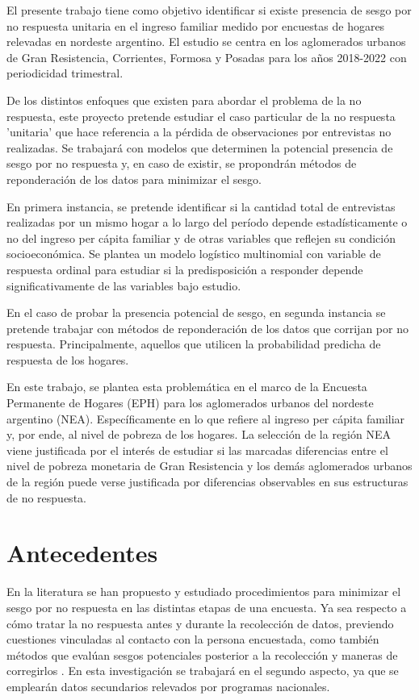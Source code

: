 \documentclass{article}
\begin{document}
El presente trabajo tiene como objetivo identificar si existe presencia de sesgo por no respuesta unitaria en el ingreso familiar medido por encuestas de hogares relevadas en nordeste argentino. El estudio se centra en los aglomerados urbanos de Gran Resistencia, Corrientes, Formosa y Posadas para los años 2018-2022 con periodicidad trimestral.

De los distintos enfoques que existen para abordar el problema de la no respuesta, este proyecto pretende estudiar el caso particular de la no respuesta 'unitaria' que hace referencia a la pérdida de observaciones por entrevistas no realizadas. Se trabajará con modelos que determinen la potencial presencia de sesgo por no respuesta y, en caso de existir, se propondrán métodos de reponderación de los datos para minimizar el sesgo.

En primera instancia, se pretende identificar si la cantidad total de entrevistas realizadas por un mismo hogar a lo largo del período depende estadísticamente o no del ingreso per cápita familiar y de otras variables que reflejen su condición socioeconómica. Se plantea un modelo logístico multinomial con variable de respuesta ordinal para estudiar si la predisposición a responder depende significativamente de las variables bajo estudio. \cite{handbook} \cite{korinek07}

En el caso de probar la presencia potencial de sesgo, en segunda instancia se pretende trabajar con métodos de reponderación de los datos que corrijan por no respuesta. Principalmente, aquellos que utilicen la probabilidad predicha de respuesta de los hogares.

En este trabajo, se plantea esta problemática en el marco de la Encuesta Permanente de Hogares (EPH) para los aglomerados urbanos del nordeste argentino (NEA). Específicamente en lo que refiere al ingreso per cápita familiar y, por ende, al nivel de pobreza de los hogares. La selección de la región NEA viene justificada por el interés de estudiar si las marcadas diferencias entre el nivel de pobreza monetaria de Gran Resistencia y los demás aglomerados urbanos de la región puede verse justificada por diferencias observables en sus estructuras de no respuesta. 


\section{Antecedentes}

En la literatura se han propuesto y estudiado procedimientos para minimizar el sesgo por no respuesta en las distintas etapas de una encuesta. Ya sea respecto a cómo tratar la no respuesta antes y durante la recolección de datos, previendo cuestiones vinculadas al contacto con la persona encuestada, como también métodos que evalúan sesgos potenciales posterior a la recolección y maneras de corregirlos \cite{plansurvey05}. En esta investigación se trabajará en el segundo aspecto, ya que se emplearán datos secundarios relevados por programas nacionales.
\end{document}
